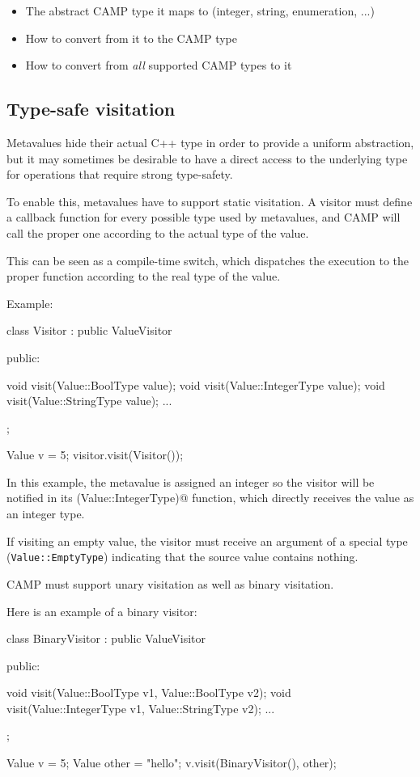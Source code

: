 \documentclass[a4paper, twoside]{report}
\begin{document}
	\begin{itemize}
		\item The abstract CAMP type it maps to (integer, string, enumeration, ...)
		\item How to convert from it to the CAMP type
		\item How to convert from \emph{all} supported CAMP types to it
	\end{itemize}

\subsection{Type-safe visitation}
\label{sec:metavalue-visitor}

	Metavalues hide their actual C++ type in order to provide a uniform abstraction, but
	it may sometimes be desirable to have a direct access to the underlying type for operations
	that require strong type-safety.
	
	To enable this, metavalues have to support static visitation. A visitor
	must define a callback function for every possible type used by metavalues,
	and CAMP will call the proper one according to the actual type of the value.
	
	This can be seen as a compile-time switch, which dispatches the execution to
	the proper function according to the real type of the value.

	Example:
	
\begin{cppcode}
class Visitor : public ValueVisitor
{
public:

  void visit(Value::BoolType value);
  void visit(Value::IntegerType value);
  void visit(Value::StringType value);
  ...
};

Value v = 5;
visitor.visit(Visitor());
\end{cppcode}
	
	In this example, the metavalue \verb@v@ is assigned an integer so the visitor will be notified
	in its \verb@visit(Value::IntegerType)@ function, which directly receives the value as an integer type.
	
	\ibinfo
	{
		If visiting an empty value, the visitor must receive an argument of a special type (\texttt{Value::EmptyType})
		indicating that the source value contains nothing.
	}

	CAMP must support unary visitation as well as binary visitation.
	
	Here is an example of a binary visitor:

\begin{cppcode}
class BinaryVisitor : public ValueVisitor
{
public:

  void visit(Value::BoolType v1, Value::BoolType v2);
  void visit(Value::IntegerType v1, Value::StringType v2);
  ...
};

Value v = 5;
Value other = "hello";
v.visit(BinaryVisitor(), other);
\end{cppcode}
	
\end{document}

